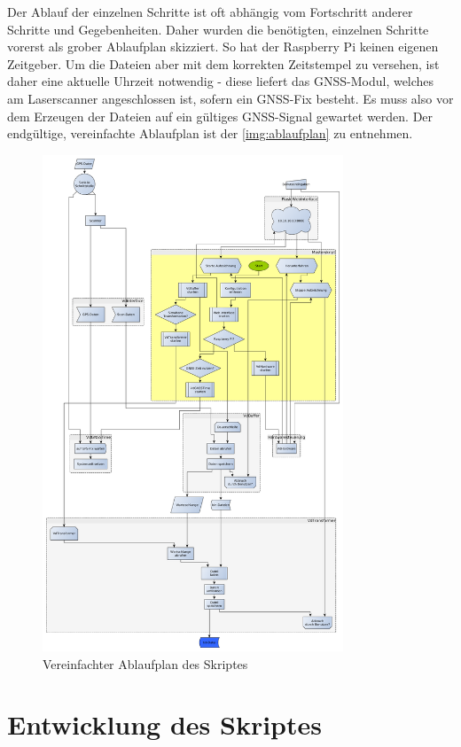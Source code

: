 \documentclass[a4paper,12pt,bibliography=totoc, listof=totoc,titlepage,pointlessnumbers]{scrreprt}
\begin{document}
Der Ablauf der einzelnen Schritte ist oft abhängig vom Fortschritt anderer Schritte und Gegebenheiten. Daher wurden die benötigten, einzelnen Schritte vorerst als grober Ablaufplan skizziert. So hat der Raspberry Pi keinen eigenen Zeitgeber. Um die Dateien aber mit dem korrekten Zeitstempel zu versehen, ist daher eine aktuelle Uhrzeit notwendig - diese liefert das GNSS-Modul, welches am Laser\-scan\-ner angeschlossen ist, sofern ein GNSS-Fix besteht. Es muss also vor dem Erzeugen der Dateien auf ein gültiges GNSS-Signal gewartet werden. Der endgültige, vereinfachte Ablaufplan ist der \autoref{img:ablaufplan} zu entnehmen. 
\begin{figure}
 \centering
 \includegraphics[width=0.8\textwidth]{./img/Ablaufplan.png}
 \caption{Vereinfachter Ablaufplan des Skriptes}
 \label{img:ablaufplan}
\end{figure}

\chapter{Entwicklung des Skriptes}
\label{c:skript}
\end{document}

